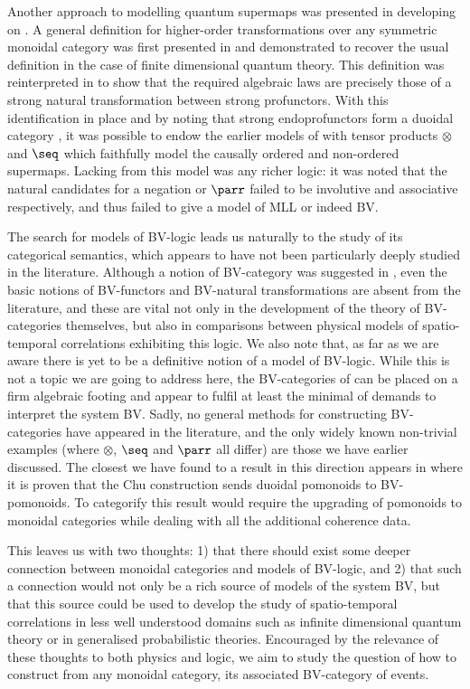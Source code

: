 Another approach to modelling quantum supermaps was presented in \cite{hefford_supermaps} developing on \cite{wilson_locality,wilson_polycategories}.
A general definition for higher-order transformations over any symmetric monoidal category was first presented in \cite{wilson_locality} and demonstrated to recover the usual definition in the case of finite dimensional quantum theory.
This definition was reinterpreted in \cite{hefford_supermaps} to show that the required algebraic laws are precisely those of a strong natural transformation between strong profunctors.
With this identification in place and by noting that strong endoprofunctors form a duoidal category \cite{garner,earnshaw,roman_thesis}, it was possible to endow the earlier models of \cite{wilson_locality,wilson_polycategories} with tensor products $\otimes$ and $\seq$ which faithfully model the causally ordered and non-ordered supermaps.
Lacking from this model was any richer logic: it was noted that the natural candidates for a negation or $\parr$ failed to be involutive and associative respectively, and thus failed to give a model of MLL or indeed BV.

The search for models of BV-logic leads us naturally to the study of its categorical semantics, which appears to have not been particularly deeply studied in the literature.
Although a notion of BV-category was suggested in \cite{blute_BV}, even the basic notions of BV-functors and BV-natural transformations are absent from the literature, and these are vital not only in the development of the theory of BV-categories themselves, but also in comparisons between physical models of spatio-temporal correlations exhibiting this logic.
We also note that, as far as we are aware there is yet to be a definitive notion of a model of BV-logic.
While this is not a topic we are going to address here, the BV-categories of \cite{blute_BV} can be placed on a firm algebraic footing and appear to fulfil at least the minimal of demands to interpret the system BV.
Sadly, no general methods for constructing BV-categories have appeared in the literature, and the only widely known non-trivial examples (where $\otimes$, $\seq$ and $\parr$ all differ) are those we have earlier discussed.
The closest we have found to a result in this direction appears in \cite{atkey_bv} where it is proven that the Chu construction \cite{chu,barr} sends duoidal pomonoids to BV-pomonoids.
To categorify this result would require the upgrading of pomonoids to monoidal categories while dealing with all the additional coherence data.

This leaves us with two thoughts: 1) that there should exist some deeper connection between monoidal categories and models of BV-logic, and 2) that such a connection would not only be a rich source of models of the system BV, but that this source could be used to develop the study of spatio-temporal correlations in less well understood domains such as infinite dimensional quantum theory or in generalised probabilistic theories.
Encouraged by the relevance of these thoughts to both physics and logic, we aim to study the question of how to construct from any monoidal category, its associated BV-category of events.